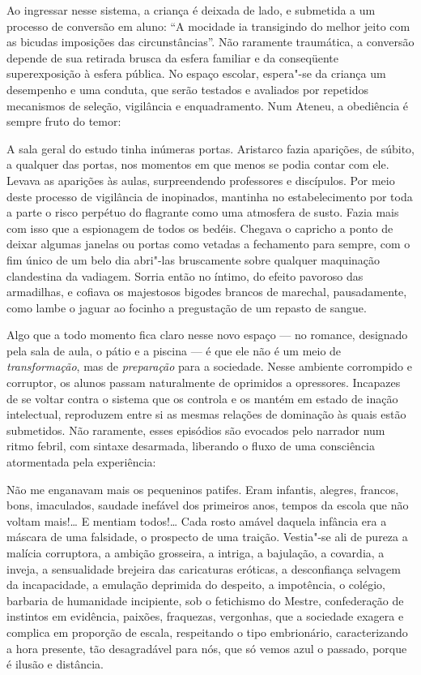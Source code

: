 Ao ingressar nesse sistema, a criança é deixada de lado, e submetida a
um processo de conversão em aluno: ``A mocidade ia transigindo do melhor
jeito com as bicudas imposições das circunstâncias''. Não raramente
traumática, a conversão depende de sua retirada brusca da esfera
familiar e da conseqüente superexposição à esfera pública. No espaço
escolar, espera"-se da criança um desempenho e uma conduta, que serão
testados e avaliados por repetidos mecanismos de seleção, vigilância e
enquadramento. Num Ateneu, a obediência é sempre fruto do temor:

\begin{hedraquote}
A sala geral do estudo tinha inúmeras portas. Aristarco fazia aparições,
de súbito, a qualquer das portas, nos momentos em que menos se podia
contar com ele. 
Levava as aparições às aulas, surpreendendo professores e discípulos.
Por meio deste processo de vigilância de inopinados, mantinha no
estabelecimento por toda a parte o risco perpétuo do flagrante como uma
atmosfera de susto. Fazia mais com isso que a espionagem de todos os
bedéis. Chegava o capricho a ponto de deixar algumas janelas ou portas
como vetadas a fechamento para sempre, com o fim único de um belo dia
abri"-las bruscamente sobre qualquer maquinação clandestina da
vadiagem. Sorria então no íntimo, do efeito pavoroso das armadilhas, e
cofiava os majestosos bigodes brancos de marechal, pausadamente, como
lambe o jaguar ao focinho a pregustação de um repasto de sangue.  
\end{hedraquote}

Algo que a todo momento fica claro nesse novo espaço ---
no romance, designado pela sala de aula, o pátio e a piscina --- é que
ele não é um meio de \textit{transformação},
mas de \textit{preparação} para a sociedade.
Nesse ambiente corrompido e corruptor, os alunos passam naturalmente de
oprimidos a opressores. Incapazes de se voltar contra o sistema que os
controla e os mantém em estado de inação intelectual, reproduzem entre
si as mesmas relações de dominação às quais estão submetidos. Não
raramente, esses episódios são evocados pelo narrador num ritmo febril,
com sintaxe desarmada, liberando o fluxo de uma consciência atormentada
pela experiência:

\begin{hedraquote}
Não me enganavam mais os pequeninos patifes. Eram infantis, alegres,
francos, bons, imaculados, saudade inefável dos primeiros anos, tempos
da escola que não voltam mais!\ldots{} E mentiam todos!\ldots{} Cada rosto amável
daquela infância era a máscara de uma falsidade, o prospecto de uma
traição. Vestia"-se ali de pureza a malícia corruptora, a ambição
grosseira, a intriga, a bajulação, a covardia, a inveja, a sensualidade
brejeira das caricaturas eróticas, a desconfiança selvagem da
incapacidade, a emulação deprimida do despeito, a impotência, o
colégio, barbaria de humanidade incipiente, sob o fetichismo do Mestre,
confederação de instintos em evidência, paixões, fraquezas, vergonhas,
que a sociedade exagera e complica em proporção de escala, respeitando
o tipo embrionário, caracterizando a hora presente, tão desagradável
para nós, que só vemos azul o passado, porque é ilusão e distância.
\end{hedraquote}


